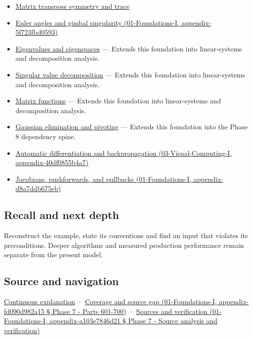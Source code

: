 \begin{itemize}
\item
  \hyperref[appendix-175ca5ff874d]{Matrix transpose symmetry and trace}
\item
  \href{}{Euler angles and gimbal singularity (01-Foundations-I, appendix-5f723fbd0593)}
\item
  \hyperref[appendix-0b3be18411f9]{Eigenvalues and eigenspaces} --- Extends this foundation into linear-systems and decomposition analysis.
\item
  \hyperref[appendix-1fad5e7f36fa]{Singular value decomposition} --- Extends this foundation into linear-systems and decomposition analysis.
\item
  \hyperref[appendix-0f4bc2bf2b1f]{Matrix functions} --- Extends this foundation into linear-systems and decomposition analysis.
\item
  \hyperref[appendix-f6e77f4a200f]{Gaussian elimination and pivoting} --- Extends this foundation into the Phase 8 dependency spine.
\item
  \href{}{Automatic differentiation and backpropagation (03-Visual-Computing-I, appendix-40df0855b4a7)}
\item
  \href{}{Jacobians, pushforwards, and pullbacks (01-Foundations-I, appendix-d8a7ddb675eb)}
\end{itemize}

\subsection{Recall and next depth}\label{recall-and-next-depth}

Reconstruct the example, state its conventions and find an input that violates its preconditions. Deeper algorithms and measured production performance remain separate from the present model.

\subsection{Source and navigation}\label{source-and-navigation}

\href{Continuous\%20Notes/Computing\%20Foundations\%20-\%20From\%20Bits\%20to\%20C++\%20and\%20Systems\%20APIs\#Keep\%20the\%20promises\%20visible\%20while\%20moving\%20between\%20representations}{Continuous explanation} · \href{}{Coverage and source gap (01-Foundations-I, appendix-fd090d982a15 § Phase 7 - Parts 601-700)} · \href{}{Sources and verification (01-Foundations-I, appendix-a103e7846d21 § Phase 7 - Source analysis and verification)}

